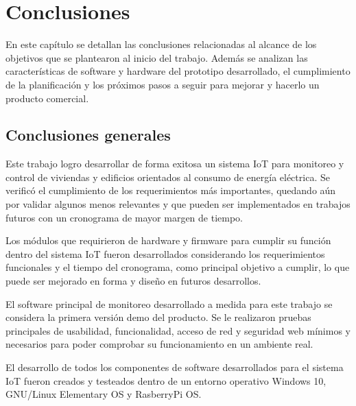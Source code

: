 
\chapter{Conclusiones} %

\label{Chapter5} %

En este capítulo se detallan las conclusiones relacionadas al alcance de los objetivos que se plantearon al inicio del trabajo. Además se analizan las características de software y hardware del prototipo desarrollado, el cumplimiento de la planificación y los próximos pasos a seguir para mejorar y hacerlo un producto
comercial.



\section{Conclusiones generales }

Este trabajo logro desarrollar de forma exitosa un sistema IoT para monitoreo y control de viviendas y edificios orientados al consumo de energía eléctrica. Se verificó el cumplimiento de los requerimientos más importantes, quedando aún por validar algunos menos relevantes y que pueden ser implementados en trabajos futuros con un cronograma de mayor margen de tiempo.

Los módulos que requirieron de hardware y firmware para cumplir su función dentro del sistema IoT fueron desarrollados considerando los requerimientos funcionales y el tiempo del cronograma, como principal objetivo a cumplir, lo que puede ser mejorado en forma y diseño en futuros desarrollos.

El software principal de monitoreo desarrollado a medida para este trabajo se considera la primera versión demo del producto. Se le realizaron pruebas principales de usabilidad, funcionalidad, acceso de red y seguridad web mínimos y necesarios para poder comprobar su funcionamiento en un ambiente real. 

El desarrollo de todos los componentes de software desarrollados para el sistema IoT fueron creados y testeados dentro de un entorno operativo Windows 10, GNU/Linux Elementary OS y RasberryPi OS. 

